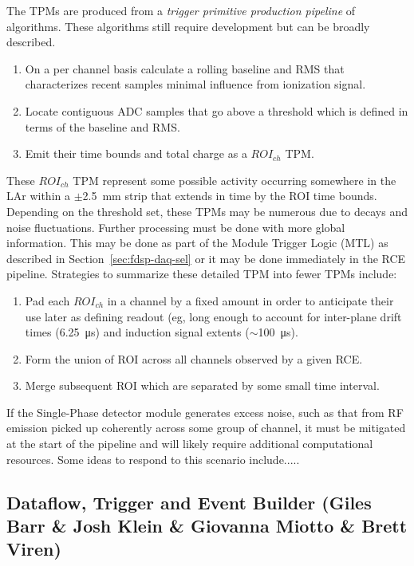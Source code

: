 The TPMs are produced from a \textit{trigger primitive production
  pipeline} of algorithms.  These algorithms still require development
but can be broadly described.   

\begin{enumerate}
\item On a per channel basis calculate a rolling baseline and RMS that
  characterizes recent samples minimal influence from ionization
  signal.
\item Locate contiguous ADC samples that go above a threshold which is
  defined in terms of the baseline and RMS.
\item Emit their time bounds and total charge as a $ROI_{ch}$ TPM.
\end{enumerate}

These $ROI_{ch}$ TPM represent some possible activity occurring
somewhere in the LAr within a $\pm$\SI{2.5}{\mm} strip that extends in
time by the ROI time bounds.  Depending on the threshold set, these
TPMs may be numerous due to  decays and noise fluctuations.
Further processing must be done with more global information.  This
may be done as part of the Module Trigger Logic (MTL) as described in
Section~\ref{sec:fdsp-daq-sel} or it may be done immediately in the
RCE pipeline.  Strategies to summarize these detailed TPM into fewer
TPMs include:

\begin{enumerate}
\item Pad each $ROI_{ch}$ in a channel by a fixed amount in order to
  anticipate their use later as defining readout (eg, long enough to
  account for inter-plane drift times (\SI{6.25}{\micro\second}) and
  induction signal extents ($\sim$\SI{100}{\micro\second}).
\item Form the union of ROI across all channels observed by a given RCE.
\item Merge subsequent ROI which are separated by some small time
  interval.
\end{enumerate}

If the Single-Phase detector module generates excess noise, such as
that from RF emission picked up coherently across some group of
channel, it must be mitigated at the start of the pipeline and will
likely require additional computational resources.  Some ideas to
respond to this scenario include.....



\subsection{Dataflow, Trigger and Event Builder (Giles Barr \& Josh Klein \& Giovanna Miotto \& Brett Viren)}
\label{sec:fdsp-daq-hlt}

